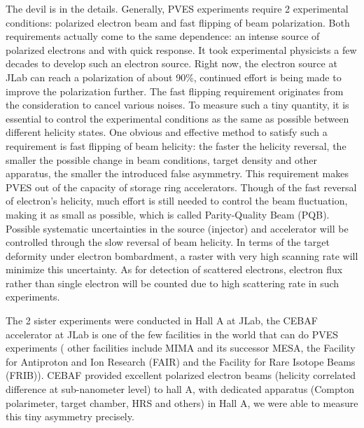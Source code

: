 The devil is in the details.
Generally, PVES experiments require 2 experimental conditions: polarized electron
beam and fast flipping of beam polarization. Both requirements actually come to 
the same dependence: an intense source of polarized electrons and with quick response. 
It took experimental physicists a few decades to develop such an electron source.
Right now, the electron source at JLab can reach a polarization of about 90\%,
continued effort is being made to improve the polarization further.
The fast flipping requirement originates from the consideration to cancel various 
noises. To measure such a tiny quantity, it is essential to control
the experimental conditions as the same as possible between different
helicity states. One obvious and effective method to satisfy such a requirement is fast 
flipping of beam helicity: the faster the helicity reversal, the smaller
the possible change in beam conditions, target density and other apparatus, the smaller
the introduced false asymmetry. This requirement makes PVES out of the capacity
of storage ring accelerators.
Though of the fast reversal of electron's helicity, much effort is still needed to
control the beam fluctuation, making it as small as possible, which is called
Parity-Quality Beam (PQB). Possible systematic
uncertainties in the source (injector) and accelerator will be controlled through the slow
reversal of beam helicity. In terms of the target deformity under electron bombardment,
a raster with very high scanning rate will minimize this uncertainty. As for 
detection of scattered electrons, electron flux rather than single electron will
be counted due to high scattering rate in such experiments.

The 2 sister experiments were conducted in Hall A at JLab, the CEBAF accelerator 
at JLab is one of the few facilities in the world that can do PVES experiments (
other facilities include MIMA and its successor MESA, the Facility for Antiproton
and Ion Research (FAIR) and the Facility for Rare Isotope Beams (FRIB)). CEBAF 
provided excellent polarized electron beams (helicity correlated difference at 
sub-nanometer level) to hall A, with dedicated apparatus 
(Compton polarimeter, target chamber, HRS and others) in Hall A, we were able 
to measure this tiny asymmetry precisely.

